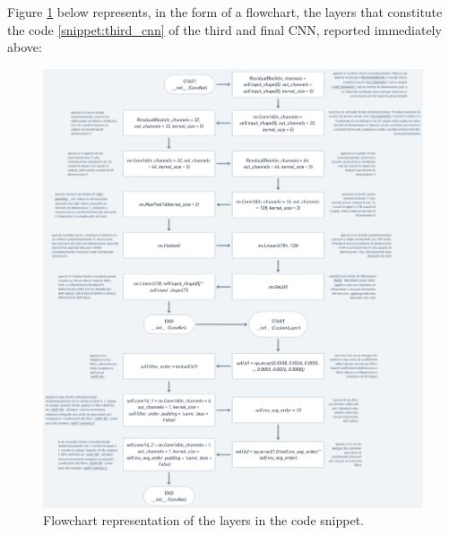 \documentclass[12pt,english]{report}
\begin{document}
Figure \ref{fig:third_cnn_layers} below represents, in the form of a flowchart, the layers that constitute the code \ref{snippet:third_cnn} of the third and final CNN, reported immediately above:

\begin{figure}[H]
    \centering
    \includegraphics[width=1\textwidth]{images/third_cnn_layers.png}
    \captionsetup{justification=centering}
    \caption{Flowchart representation of the layers in the code snippet.}
    \label{fig:third_cnn_layers}
\end{figure}
\end{document}
